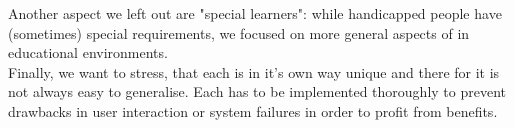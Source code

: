 Another aspect we left out are "special learners": while handicapped people have (sometimes) special requirements, we focused on more general aspects of \AR in educational environments. \\
% 
% 

Finally, we want to stress, that each \AR \app is in it's own way unique and there for it is not always easy to generalise. Each \app has to be implemented thoroughly to prevent drawbacks in user interaction or system failures in order to profit from benefits.
